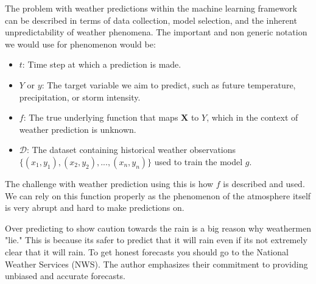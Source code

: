 \documentclass[12pt]{article}
\begin{document}

\begin{enumerate}


The problem with weather predictions within the machine learning framework can be described in terms of data collection, model selection, and the inherent unpredictability of weather phenomena. The important and non generic notation we would use for phenomenon would be: 
\begin{itemize}
    \item $t$: Time step at which a prediction is made.
    \item $Y$ or $y$: The target variable we aim to predict, such as future temperature, precipitation, or storm intensity.
    \item $f$: The true underlying function that maps $\mathbf{X}$ to $Y$, which in the context of weather prediction is unknown.
    \item $\mathcal{D}$: The dataset containing historical weather observations $\{(x_{1}, y_{1}), (x_{2}, y_{2}), ..., (x_{n}, y_{n})\}$ used to train the model $g$.
\end{itemize}
The challenge with weather prediction using this is how $f$ is described and used. We can rely on this function properly as the phenomenon of the atmosphere itself is very abrupt and hard to make predictions on.


Over predicting to show caution towards the rain is a big reason why weathermen "lie." This is because its safer to predict that it will rain even if its not extremely clear that it will rain. To get honest forecasts you should go to the National Weather Services (NWS). The author emphasizes their commitment to providing unbiased and accurate forecasts.


\end{enumerate}
\end{document}

